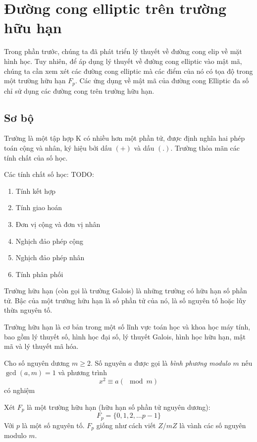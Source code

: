 \section{Đường cong elliptic trên trường hữu hạn}

Trong phần trước, chúng ta đã phát triển lý thuyết về đường cong elip về mặt hình học.
Tuy nhiên, để áp dụng lý thuyết về đường cong elliptic vào mật mã,
chúng ta cần xem xét các đường cong elliptic mà các điểm của nó có tọa độ trong một trường hữu hạn $F_p$.
Các ứng dụng về mật mã của đường cong Elliptic đa số chỉ sử dụng các đường
cong trên trường hữu hạn.

\subsection{Sơ bộ}
\begin{definition}
	Trường là một tập hợp K có nhiều hơn một phần tử, được định nghĩa hai phép toán cộng và nhân,
	ký hiệu bởi dấu $(+)$ và dấu $(.)$. Trường thỏa mãn các tính chất của số học.
\end{definition}
Các tính chất số học:
TODO:
\begin{enumerate}
	\item Tính kết hợp
	\item Tính giao hoán
	\item Đơn vị cộng và đơn vị nhân
	\item Nghịch đảo phép cộng
	\item Nghịch đảo phép nhân
	\item Tính phân phối
\end{enumerate}

\begin{definition}
	Trường hữu hạn (còn gọi là trường Galois) là những trường có hữu hạn số phần tử.
	Bậc của một trường hữu hạn là số phần tử của nó, là số nguyên tố hoặc lũy thừa nguyên tố.
\end{definition}
Trường hữu hạn là cơ bản trong một số lĩnh vực toán học và khoa học máy tính,
bao gồm lý thuyết số, hình học đại số, lý thuyết Galois, hình học hữu hạn, mật mã và lý thuyết mã hóa.

\begin{definition}
	Cho số nguyên dương $m \geq 2$. Số nguyên $a$ được gọi là \textit{bình phương modulo $m$} nếu $\gcd(a,m) = 1$ và phương trình
	$$x^2 \equiv a (\mod{m})$$
	có nghiệm
\end{definition}

Xét $F_p$ là một trường hữu hạn (hữu hạn số phần tử nguyên dương):
$$F_p = \{0, 1, 2, \ldots p-1\}$$
Với $p$ là một số nguyên tố. $F_p$ giống như cách viết $Z/mZ$ là vành các số nguyên modulo $m$.
